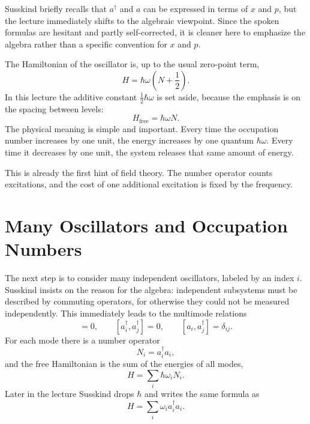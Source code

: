 \begin{remark}
Susskind briefly recalls that \(a^\dagger\) and \(a\) can be expressed in terms of \(x\) and \(p\), but the lecture immediately shifts to the algebraic viewpoint. Since the spoken formulas are hesitant and partly self-corrected, it is cleaner here to emphasize the algebra rather than a specific convention for \(x\) and \(p\).
\end{remark}

The Hamiltonian of the oscillator is, up to the usual zero-point term,
\begin{equation}
H = \hbar \omega \left(N+\frac{1}{2}\right).
\end{equation}
In this lecture the additive constant \(\frac{1}{2}\hbar\omega\) is set aside, because the emphasis is on the spacing between levels:
\begin{equation}
H_{\mathrm{free}} = \hbar \omega N.
\end{equation}
The physical meaning is simple and important. Every time the occupation number increases by one unit, the energy increases by one quantum \(\hbar\omega\). Every time it decreases by one unit, the system releases that same amount of energy.

This is already the first hint of field theory. The number operator counts excitations, and the cost of one additional excitation is fixed by the frequency.

\section{Many Oscillators and Occupation Numbers}

The next step is to consider many independent oscillators, labeled by an index \(i\). Susskind insists on the reason for the algebra: independent subsystems must be described by commuting operators, for otherwise they could not be measured independently. This immediately leads to the multimode relations
\begin{equation}
[a_i,a_j]=0,\qquad [a_i^\dagger,a_j^\dagger]=0,\qquad [a_i,a_j^\dagger]=\delta_{ij}.
\end{equation}
For each mode there is a number operator
\begin{equation}
N_i = a_i^\dagger a_i,
\end{equation}
and the free Hamiltonian is the sum of the energies of all modes,
\begin{equation}
H = \sum_i \hbar \omega_i N_i.
\end{equation}
Later in the lecture Susskind drops \(\hbar\) and writes the same formula as
\begin{equation}
H = \sum_i \omega_i a_i^\dagger a_i.
\end{equation}

